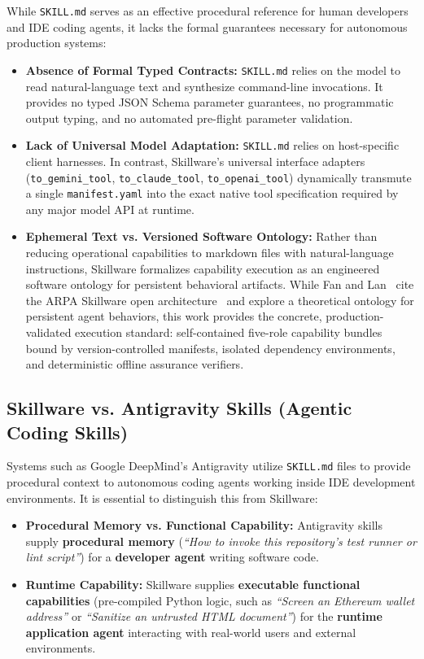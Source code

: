 While \texttt{SKILL.md} serves as an effective procedural reference for human developers and IDE coding agents, it lacks the formal guarantees necessary for autonomous production systems:
\begin{itemize}[leftmargin=*]
  \item \textbf{Absence of Formal Typed Contracts:} \texttt{SKILL.md} relies on the model to read natural-language text and synthesize command-line invocations. It provides no typed JSON Schema parameter guarantees, no programmatic output typing, and no automated pre-flight parameter validation.
  \item \textbf{Lack of Universal Model Adaptation:} \texttt{SKILL.md} relies on host-specific client harnesses. In contrast, Skillware's universal interface adapters (\texttt{to\_gemini\_tool}, \allowbreak\texttt{to\_claude\_tool}, \allowbreak\texttt{to\_openai\_tool}) dynamically transmute a single \texttt{manifest.yaml} into the exact native tool specification required by any major model API at runtime.
  \item \textbf{Ephemeral Text vs. Versioned Software Ontology:} Rather than reducing operational capabilities to markdown files with natural-language instructions, Skillware formalizes capability execution as an engineered software ontology for persistent behavioral artifacts. While Fan and Lan~\cite{fan2026skillware} cite the ARPA Skillware open architecture~\cite{skillware2026framework} and explore a theoretical ontology for persistent agent behaviors, this work provides the concrete, production-validated execution standard: self-contained five-role capability bundles bound by version-controlled manifests, isolated dependency environments, and deterministic offline assurance verifiers.
\end{itemize}

\subsection{Skillware vs. Antigravity Skills (Agentic Coding Skills)}
\label{subsec:comp_antigravity}

Systems such as Google DeepMind's Antigravity utilize \texttt{SKILL.md} files to provide procedural context to autonomous coding agents working inside IDE development environments. It is essential to distinguish this from Skillware:
\begin{itemize}[leftmargin=*]
  \item \textbf{Procedural Memory vs. Functional Capability:} Antigravity skills supply \textbf{procedural memory} (\emph{``How to invoke this repository's test runner or lint script''}) for a \textbf{developer agent} writing software code.
  \item \textbf{Runtime Capability:} Skillware supplies \textbf{executable functional capabilities} (pre-compiled Python logic, such as \emph{``Screen an Ethereum wallet address''} or \emph{``Sanitize an untrusted HTML document''}) for the \textbf{runtime application agent} interacting with real-world users and external environments.
\end{itemize}


